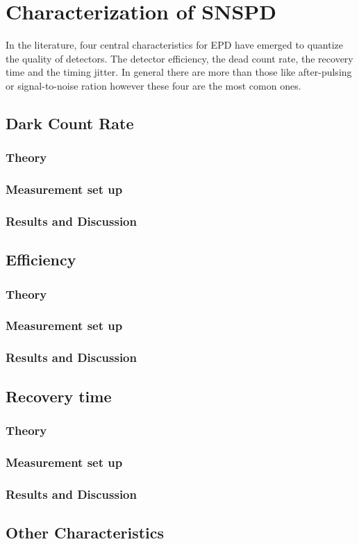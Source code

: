 
\chapter{Characterization of SNSPD}
\label{sec:SNSPD_Characterization}

In the literature, four central characteristics for EPD have emerged to quantize the quality of detectors.
The detector efficiency, the dead count rate, the recovery time and the timing jitter.
In general there are more than those like after-pulsing or signal-to-noise ration however these four are the most comon ones.\\

\section{Dark Count Rate}
\subsection*{Theory}
\subsection*{Measurement set up}
\subsection*{Results and Discussion}

\section{Efficiency}
\subsection*{Theory}
\subsection*{Measurement set up}
\subsection*{Results and Discussion}
\section{Recovery time}
\subsection*{Theory}
\subsection*{Measurement set up}
\subsection*{Results and Discussion}
\section{Other Characteristics}
